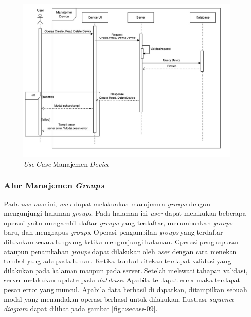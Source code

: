 \begin{figure}[ht]
  \centering
  \includegraphics[width=1\textwidth]{resources/chapter-3/usecase/uc-08.jpg}
  \caption{\textit{Use Case} Manajemen \textit{Device}}
  \label{fig:usecase-08}
\end{figure}

\pagebreak

\subsubsection{Alur Manajemen \textit{Groups}}

Pada \textit{use case} ini, \textit{user} dapat melakuakan manajemen \textit{groups} dengan mengunjungi halaman \textit{groups}. Pada halaman ini \textit{user} dapat melakukan beberapa operasi yaitu mengambil daftar \textit{groups} yang terdaftar, menambahkan \textit{groups} baru, dan menghapus \textit{groups}. Operasi pengambilan \textit{groups} yang terdaftar dilakukan secara langsung ketika mengunjungi halaman. Operasi penghapusan ataupun penambahan \textit{groups} dapat dilakukan oleh \textit{user} dengan cara menekan tombol yang ada pada laman. Ketika tombol ditekan terdapat validasi yang dilakukan pada halaman maupun pada server. Setelah melewati tahapan validasi, server melakukan update pada \textit{database}. Apabila terdapat error maka terdapat pesan error yang muncul. Apabila data berhasil di dapatkan, ditampilkan sebuah modal yang menandakan operasi berhasil untuk dilakukan. Ilustrasi \textit{sequence diagram} dapat dilihat pada gambar \ref{fig:usecase-09}.


